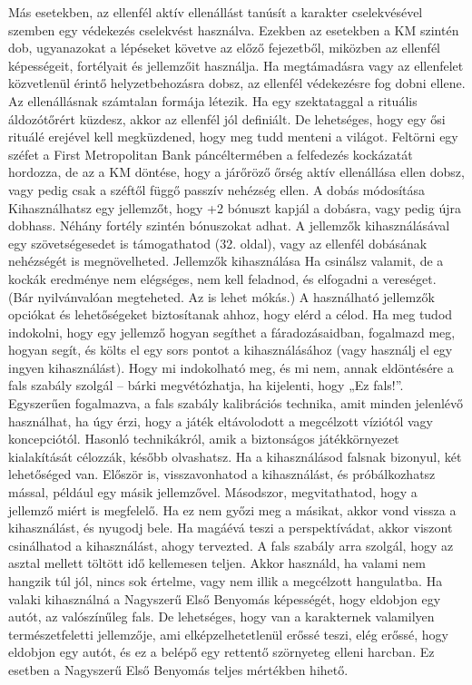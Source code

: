\documentclass[oneside]{book}
\begin{document}
Más esetekben, az ellenfél aktív ellenállást tanúsít a karakter cselekvésével szemben egy védekezés cselekvést használva. Ezekben az esetekben a KM szintén dob, ugyanazokat a lépéseket követve az előző fejezetből, miközben az ellenfél képességeit, fortélyait és jellemzőit használja. Ha megtámadásra vagy az ellenfelet közvetlenül érintő helyzetbehozásra dobsz, az ellenfél védekezésre fog dobni ellene.
Az ellenállásnak számtalan formája létezik. Ha egy szektataggal a rituális áldozótőrért küzdesz, akkor az ellenfél jól definiált. De lehetséges, hogy egy ősi rituálé erejével kell megküzdened, hogy meg tudd menteni a világot. Feltörni egy széfet a First Metropolitan Bank páncéltermében a felfedezés kockázatát hordozza, de az a KM döntése, hogy a járőröző őrség aktív ellenállása ellen dobsz, vagy pedig csak a széftől függő passzív nehézség ellen.
A dobás módosítása
Kihasználhatsz egy jellemzőt, hogy +2 bónuszt kapjál a dobásra, vagy pedig újra dobhass. Néhány fortély szintén bónuszokat adhat. A jellemzők kihasználásával egy szövetségesedet is támogathatod (32. oldal), vagy az ellenfél dobásának nehézségét is megnövelheted.
Jellemzők kihasználása
Ha csinálsz valamit, de a kockák eredménye nem elégséges, nem kell feladnod, és elfogadni a vereséget. (Bár nyilvánvalóan megteheted. Az is lehet mókás.) A használható jellemzők opciókat és lehetőségeket biztosítanak ahhoz, hogy elérd a célod.
Ha meg tudod indokolni, hogy egy jellemző hogyan segíthet a fáradozásaidban, fogalmazd meg, hogyan segít, és költs el egy sors pontot a kihasználásához (vagy használj el egy ingyen kihasználást). Hogy mi indokolható meg, és mi nem, annak eldöntésére a fals szabály szolgál – bárki megvétózhatja, ha kijelenti, hogy „Ez fals!”. Egyszerűen fogalmazva, a fals szabály kalibrációs technika, amit minden jelenlévő használhat, ha úgy érzi, hogy a játék eltávolodott a megcélzott víziótól vagy koncepciótól. Hasonló technikákról, amik a biztonságos játékkörnyezet kialakítását célozzák, később olvashatsz.
Ha a kihasználásod falsnak bizonyul, két lehetőséged van. Először is, visszavonhatod a kihasználást, és próbálkozhatsz mással, például egy másik jellemzővel. Másodszor, megvitathatod, hogy a jellemző miért is megfelelő. Ha ez nem győzi meg a másikat, akkor vond vissza a kihasználást, és nyugodj bele. Ha magáévá teszi a perspektívádat, akkor viszont csinálhatod a kihasználást, ahogy tervezted. A fals szabály arra szolgál, hogy az asztal mellett töltött idő kellemesen teljen. Akkor használd, ha valami nem hangzik túl jól, nincs sok értelme, vagy nem illik a megcélzott hangulatba. Ha valaki kihasználná a Nagyszerű Első Benyomás képességét, hogy eldobjon egy autót, az valószínűleg fals. De lehetséges, hogy van a karakternek valamilyen természetfeletti jellemzője, ami elképzelhetetlenül erőssé teszi, elég erőssé, hogy eldobjon egy autót, és ez a belépő egy rettentő szörnyeteg elleni harcban. Ez esetben a Nagyszerű Első Benyomás teljes mértékben hihető.
\end{document}
